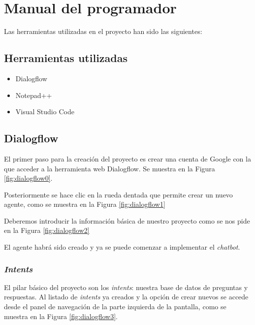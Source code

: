 \section{Manual del programador}

Las herramientas utilizadas en el proyecto han sido las siguientes:

\subsection{Herramientas utilizadas}
\begin{itemize}
	\tightlist
	\item
	Dialogflow
	\item
	Notepad++
	\item 
	Visual Studio Code
\end{itemize}


\subsection{Dialogflow}

El primer paso para la creación del proyecto es crear una cuenta de Google con la que acceder a la herramienta web Dialogflow. Se muestra en la Figura \ref{fig:dialogflow0}.


Posteriormente se hace clic en la rueda dentada que permite crear un nuevo agente, como se muestra en la Figura \ref{fig:dialogflow1}

Deberemos introducir la información básica de nuestro proyecto como se nos pide en la Figura \ref{fig:dialogflow2}

El agente habrá sido creado y ya se puede comenzar a implementar el \textit{chatbot}.

\newpage
\subsubsection{\textit{Intents}}

El pilar básico del proyecto son los \textit{intents}: nuestra base de datos de preguntas y respuestas. Al listado de \textit{intents} ya creados y la opción de crear nuevos se accede desde el panel de navegación de la parte izquierda de la pantalla, como se muestra en la Figura \ref{fig:dialogflow3}.

